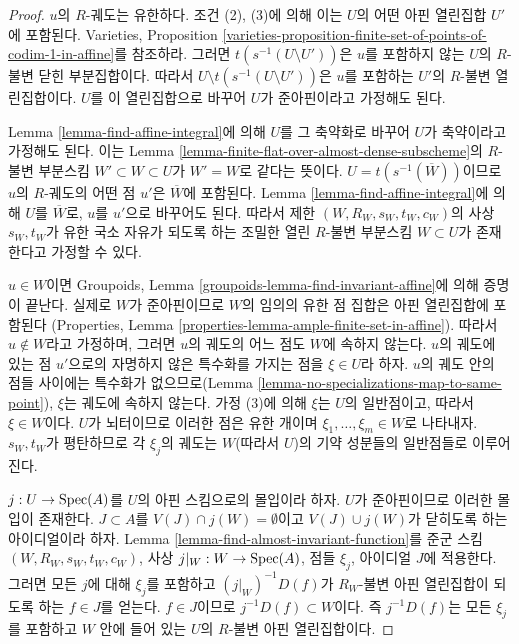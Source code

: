 \begin{proof}
$u$의 $R$-궤도는 유한하다. 조건 (2), (3)에 의해 이는 $U$의 어떤 아핀
열린집합 $U'$에 포함된다. Varieties, Proposition
\ref{varieties-proposition-finite-set-of-points-of-codim-1-in-affine}를 참조하라.
그러면 $t(s^{-1}(U \setminus U'))$은 $u$를 포함하지 않는 $U$의 $R$-불변
닫힌 부분집합이다. 따라서 $U \setminus t(s^{-1}(U \setminus U'))$은
$u$를 포함하는 $U'$의 $R$-불변 열린집합이다. $U$를 이 열린집합으로
바꾸어 $U$가 준아핀이라고 가정해도 된다.

\medskip\noindent
Lemma \ref{lemma-find-affine-integral}에 의해 $U$를 그 축약화로 바꾸어
$U$가 축약이라고 가정해도 된다. 이는 Lemma
\ref{lemma-finite-flat-over-almost-dense-subscheme}의 $R$-불변 부분스킴
$W' \subset W \subset U$가 $W' = W$로 같다는 뜻이다.
$U = t(s^{-1}(\overline{W}))$이므로 $u$의 $R$-궤도의 어떤 점
$u'$은 $\overline{W}$에 포함된다. Lemma \ref{lemma-find-affine-integral}에 의해
$U$를 $\overline{W}$로, $u$를 $u'$으로 바꾸어도 된다. 따라서 제한
$(W, R_W, s_W, t_W, c_W)$의 사상 $s_W, t_W$가 유한 국소 자유가 되도록 하는
조밀한 열린 $R$-불변 부분스킴 $W \subset U$가 존재한다고 가정할 수 있다.

\medskip\noindent
$u \in W$이면 Groupoids, Lemma
\ref{groupoids-lemma-find-invariant-affine}에 의해 증명이 끝난다. 실제로 $W$가
준아핀이므로 $W$의 임의의 유한 점 집합은 아핀 열린집합에 포함된다
(Properties, Lemma \ref{properties-lemma-ample-finite-set-in-affine}).
따라서 $u \not \in W$라고 가정하며, 그러면 $u$의 궤도의 어느 점도 $W$에
속하지 않는다. $u$의 궤도에 있는 점 $u'$으로의 자명하지 않은 특수화를
가지는 점을 $\xi \in U$라 하자. $u$의 궤도 안의 점들 사이에는 특수화가
없으므로(Lemma \ref{lemma-no-specializations-map-to-same-point}), $\xi$는
궤도에 속하지 않는다. 가정 (3)에 의해 $\xi$는 $U$의 일반점이고, 따라서
$\xi \in W$이다. $U$가 뇌터이므로 이러한 점은 유한 개이며
$\xi_1, \ldots, \xi_m \in W$로 나타내자. $s_W, t_W$가 평탄하므로 각
$\xi_j$의 궤도는 $W$(따라서 $U$)의 기약 성분들의 일반점들로 이루어진다.

\medskip\noindent
$j : U \to \mathop{\mathrm{Spec}}(A)$를 $U$의 아핀 스킴으로의 몰입이라 하자. $U$가
준아핀이므로 이러한 몰입이 존재한다. $J \subset A$를
$V(J) \cap j(W) = \emptyset$이고 $V(J) \cup j(W)$가 닫히도록 하는
아이디얼이라 하자. Lemma \ref{lemma-find-almost-invariant-function}를 준군 스킴
$(W, R_W, s_W, t_W, c_W)$, 사상 $j|_W : W \to \mathop{\mathrm{Spec}}(A)$, 점들 $\xi_j$,
아이디얼 $J$에 적용한다. 그러면 모든 $j$에 대해 $\xi_j$를 포함하고
$(j|_W)^{-1}D(f)$가 $R_W$-불변 아핀 열린집합이 되도록 하는 $f \in J$를
얻는다. $f \in J$이므로 $j^{-1}D(f) \subset W$이다. 즉 $j^{-1}D(f)$는
모든 $\xi_j$를 포함하고 $W$ 안에 들어 있는 $U$의 $R$-불변 아핀 열린집합이다.


\end{proof}
